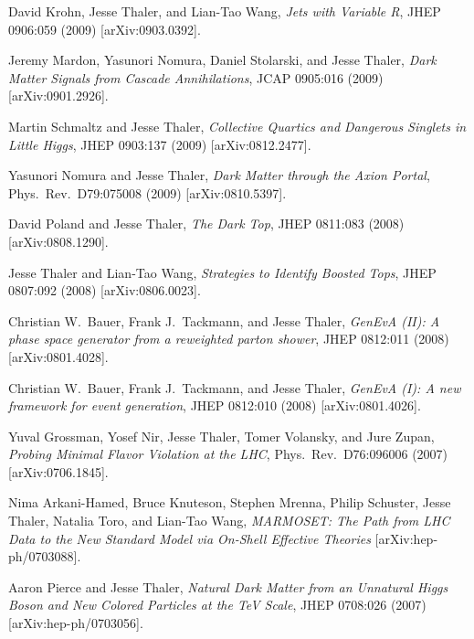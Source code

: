 \begin{list}{[]\addtocounter{jessecount}{-1}}{\leftmargin=3em \itemsep=4pt}
\item
 David Krohn, Jesse Thaler, and Lian-Tao Wang,
\emph{Jets with Variable R},
JHEP 0906:059 (2009)
[arXiv:0903.0392].

\item
 Jeremy Mardon, Yasunori Nomura, Daniel Stolarski, and Jesse Thaler,
\emph{Dark Matter Signals from Cascade Annihilations},
JCAP 0905:016 (2009)
[arXiv:0901.2926].

\item
 Martin Schmaltz and Jesse Thaler,
\emph{Collective Quartics and Dangerous Singlets in Little Higgs},
JHEP 0903:137 (2009)
[arXiv:0812.2477].

\item
 Yasunori Nomura and Jesse Thaler,
\emph{Dark Matter through the Axion Portal},
Phys.\ Rev.\ D79:075008 (2009)
[arXiv:0810.5397].

\item
 David Poland and Jesse Thaler,
\emph{The Dark Top},
JHEP 0811:083 (2008)
[arXiv:0808.1290].

\item
 Jesse Thaler and Lian-Tao Wang,
\emph{Strategies to Identify Boosted Tops},
JHEP 0807:092 (2008)
[arXiv:0806.0023].

\item
 Christian W.\ Bauer, Frank J.\ Tackmann, and Jesse Thaler,
\emph{GenEvA (II): A phase space generator from a reweighted parton shower},
JHEP 0812:011 (2008)
[arXiv:0801.4028].

\item
 Christian W.\ Bauer, Frank J.\ Tackmann, and Jesse Thaler,
\emph{GenEvA (I): A new framework for event generation},
JHEP 0812:010 (2008)
[arXiv:0801.4026].

\item
 Yuval Grossman, Yosef Nir, Jesse Thaler, Tomer Volansky, and Jure Zupan,
\emph{Probing Minimal Flavor Violation at the LHC},
Phys.\ Rev.\ D76:096006 (2007)
[arXiv:0706.1845].

\item
 Nima Arkani-Hamed, Bruce Knuteson, Stephen Mrenna, Philip Schuster, Jesse Thaler, Natalia Toro, and Lian-Tao Wang,
\emph{MARMOSET: The Path from LHC Data to the New Standard Model via On-Shell Effective Theories}
[arXiv:hep-ph/0703088].

\item
 Aaron Pierce and Jesse Thaler,
\emph{Natural Dark Matter from an Unnatural Higgs Boson and New Colored Particles at the TeV Scale},
JHEP 0708:026 (2007)
[arXiv:hep-ph/0703056].


\end{list}
